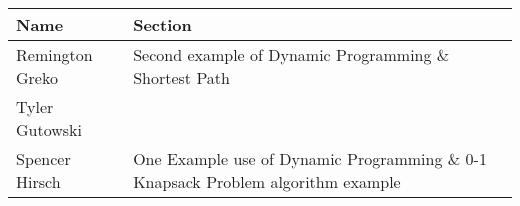 \documentclass{article}
\begin{document}
\pagebreak

\begin{center}
        \begin{tabular}{|p{3cm}|p{6cm}|}
            \hline
            \textbf{Name} & \textbf{Section} \\
            \hline
            Remington Greko & Second example of Dynamic Programming $\&$ Shortest Path\\
            \hline
            Tyler Gutowski &  \\
            \hline
            Spencer Hirsch & One Example use of Dynamic Programming $\&$ 0-1 Knapsack Problem algorithm example\\
            \hline
        \end{tabular}
    \end{center}
    
\end{document}
